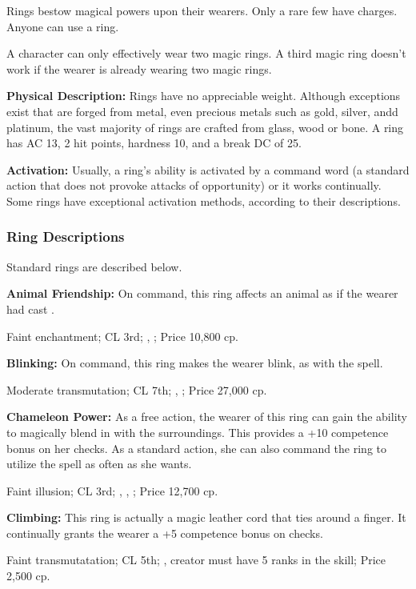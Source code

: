 Rings bestow magical powers upon their wearers. Only a rare few have charges. Anyone can use a ring.

A character can only effectively wear two magic rings. A third magic ring doesn't work if the wearer is already wearing two magic rings.

\textbf{Physical Description:} Rings have no appreciable weight. Although exceptions exist that are forged from metal, even precious metals such as gold, silver, andd platinum, the vast majority of rings are crafted from glass, wood or bone. A ring has AC 13, 2 hit points, hardness 10, and a break DC of 25.

\textbf{Activation:} Usually, a ring's ability is activated by a command word (a standard action that does not provoke attacks of opportunity) or it works continually. Some rings have exceptional activation methods, according to their descriptions.

\subsubsection{Ring Descriptions}
Standard rings are described below.

\textbf{Animal Friendship:} On command, this ring affects an animal as if the wearer had cast .

Faint enchantment; CL 3rd; , ; Price 10,800 cp.

\textbf{Blinking:} On command, this ring makes the wearer blink, as with the  spell.

Moderate transmutation; CL 7th; , ; Price 27,000 cp.

\textbf{Chameleon Power:} As a free action, the wearer of this ring can gain the ability to magically blend in with the surroundings. This provides a +10 competence bonus on her  checks. As a standard action, she can also command the ring to utilize the spell  as often as she wants.

Faint illusion; CL 3rd; , , ; Price 12,700 cp.

\textbf{Climbing:} This ring is actually a magic leather cord that ties around a finger. It continually grants the wearer a +5 competence bonus on  checks.

Faint transmutatation; CL 5th; , creator must have 5 ranks in the  skill; Price 2,500 cp.


